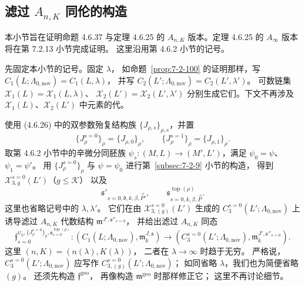 
\subsection{滤过 $A_{n,K}$ 同伦的构造}
\label{subsec:7-2-10}
%

本小节旨在证明命题 4.6.37 与定理 4.6.25 的
$A_{n,K}$ 版本。定理 4.6.25 的
$A_\infty$ 版本将在第 7.2.13 小节完成证明。
这里沿用第 4.6.2 小节的记号。

先固定本小节的记号。固定 $\lambda$，
如命题~\ref{prop:7-2-100} 的证明那样，写
$C_1(L;\Lambda_{0,\mathrm{nov}})=C_1(L,\lambda)$，
并写
$C_2(L';\Lambda_{0,\mathrm{nov}})=C_2(L',\lambda')$。
可数链集
$\mathcal X_1(L)=\mathcal X_1(L,\lambda)$、
$\mathcal X_2(L')=\mathcal X_2(L',\lambda')$
分别生成它们。下文不再涉及
$\mathcal X_1(L)$、$\mathcal X_2(L')$
中元素的代。

使用 (4.6.26) 中的双参数殆复结构族
$\{J_{\rho,s}\}_{\rho,s}$，并置
\[
\{J_\rho^{s=0}\}_\rho=\{J_{\rho,0}\}_\rho,
\qquad
\{J_\rho^{s=1}\}_\rho=\{J_{\rho,1}\}_\rho.
\]
取第 4.6.2 小节中的辛微分同胚族
$\psi_s\colon(M,L)\to(M',L')$，满足
$\psi_0=\psi$、$\psi_1=\psi'$。
用 $\{J_\rho^{s=0}\}_\rho$ 与
$\psi=\psi_0$ 进行第~\ref{subsec:7-2-9} 小节的构造，
得到 $\mathcal X^{s=0}_{3,g}(L')$（$g\le\mathcal K$）
以及
\[
\mathfrak s'_{s=0,\mathfrak d,k,\beta,\vec P'},
\qquad
\mathfrak s^{\operatorname{top}(\rho)}_{s=0,k,\beta,\vec P}.
\]
这里也省略记号中的 $\lambda,\lambda'$。
它们在由 $\mathcal X^{s=0}_{3,(g)}(L')$ 生成的
$C^{s=0}_3(L';\Lambda_{0,\mathrm{nov}})$ 上
诱导滤过 $A_{n,K}$ 代数结构
$\mathfrak m^{J',\mathfrak s''_{s=0}}$，
并给出滤过 $A_{n,K}$ 同态
\begin{equation}
\mathfrak f_{s=0}^{\psi_0,\{J^{s=0}_\rho\}_\rho,
\mathfrak s^{\operatorname{top}(\rho)}_{s=0}}
\colon
(C_1(L;\Lambda_{0,\mathrm{nov}}),\mathfrak m^{J,\mathfrak s}_k)
\longrightarrow
(C^{s=0}_3(L';\Lambda_{0,\mathrm{nov}}),
\mathfrak m^{J',\mathfrak s''_{s=0}}_k).
\tag{7.2.133}\label{eq:7-2-133}
\end{equation}
这里 $(n,K)=(n(\lambda),K(\lambda))$，
二者在 $\lambda\to\infty$ 时趋于无穷。
严格说，$C^{s=0}_3(L';\Lambda_{0,\mathrm{nov}})$
应写作 $C^{s=0}_{3,(g)}(L';\Lambda_{0,\mathrm{nov}})$；
如同省略 $\lambda$，我们也为简便省略 $(g)$。
还须先构造 $\mathfrak f^{\mathrm{geo}}$，
再像构造 $\mathfrak m^{\mathrm{geo}}$ 时那样修正它；
这里不再讨论细节。

